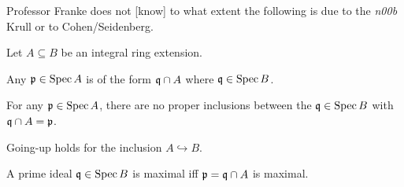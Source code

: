 \documentclass[a4paper,parskip=half,numbers=enddot, DIV=12]{scrreprt}
\begin{document}
	Professor Franke does not [know] to what extent the following is due to the \emph{n00b} Krull or to Cohen/Seidenberg.
	\begin{thm}
		Let $A\subseteq B$ be an integral ring extension.
		\begin{alphanumerate}
		\item 
			 Any $\mathfrak{p}\in\operatorname{Spec} A$ is of the form  $\mathfrak{q}\cap A$ where $\mathfrak{q}\in\operatorname{Spec} B$.
		\item 
			For any $\mathfrak{p}\in \operatorname{Spec} A$, there are no proper inclusions between the $\mathfrak{q}\in\operatorname{Spec} B$ with $\mathfrak{q}\cap A = \mathfrak{p}$.
		\item
			Going-up holds for the inclusion $A\hookrightarrow B$.
		\item
			A prime ideal $\mathfrak{q}\in\operatorname{Spec} B$ is maximal iff $\mathfrak{p} = \mathfrak{q}\cap A$ is maximal.
		\end{alphanumerate}
	\end{thm}
\end{document}
